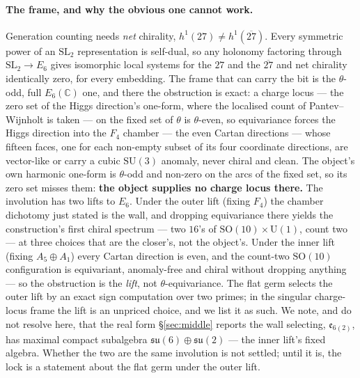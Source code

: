 \documentclass[11pt,a4paper]{article}
\theoremstyle{definition}
\theoremstyle{remark}
\begin{document}
\paragraph{The frame, and why the obvious one cannot work.} Generation counting needs \emph{net} chirality,
$h^1(27) \neq h^1(\overline{27})$. Every symmetric power of an $\mathrm{SL}_2$ representation is self-dual, so any
holonomy factoring through $\mathrm{SL}_2 \to E_6$ gives isomorphic local systems for the $27$ and the $\overline{27}$ and net chirality identically zero,
for every embedding. The frame that can carry the bit is the $\theta$-odd, full $E_6(\mathbb{C})$ one, and there
the obstruction is exact: a charge locus --- the zero set of the Higgs direction's one-form, where the localised count of Pantev--Wijnholt is taken --- on the fixed set of $\theta$ is $\theta$-even, so equivariance forces the
Higgs direction into the $F_4$ chamber --- the even Cartan directions --- whose fifteen faces, one for each
non-empty subset of its four coordinate directions, are vector-like or carry a cubic $\mathrm{SU}(3)$ anomaly,
never chiral and clean. The object's own harmonic one-form is $\theta$-odd and non-zero on the arcs of
the fixed set, so its zero set misses them: \textbf{the object supplies no charge locus there.} The involution has two lifts to $E_6$. Under the outer lift (fixing $F_4$) the chamber dichotomy just stated is the wall, and
dropping equivariance there yields the construction's first chiral spectrum --- two $16$'s of
$\mathrm{SO}(10) \times \mathrm{U}(1)$, count two --- at three choices that are the closer's, not the object's. Under the inner
lift (fixing $A_5 \oplus A_1$) every Cartan direction is even, and the count-two $\mathrm{SO}(10)$ configuration is
equivariant, anomaly-free and chiral without dropping anything --- so the obstruction is the \emph{lift}, not
$\theta$-equivariance. The flat germ selects the outer lift by an exact sign computation over two primes; in the singular
charge-locus frame the lift is an unpriced choice, and we list it as such. We note, and do not resolve here, that the real form
\S\ref{sec:middle} reports the wall selecting, $\mathfrak{e}_{6(2)}$, has maximal compact subalgebra
$\mathfrak{su}(6) \oplus \mathfrak{su}(2)$ --- the inner lift's fixed algebra. Whether the two are the same involution is not
settled; until it is, the lock is a statement about the flat germ under the outer lift.
\end{document}
